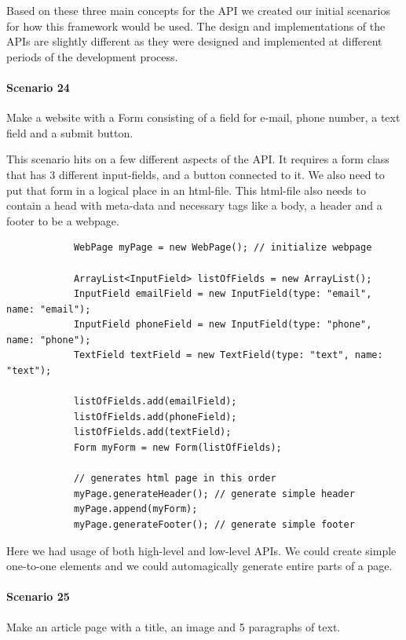 \documentclass[12pt]{article}
\begin{document}
    Based on these three main concepts for the API we created our initial scenarios for how this framework would be used. 
    The design and implementations of the APIs are slightly different as they were designed and implemented at different periods of the development process.

    \paragraph{Scenario 24}
    Make a website with a Form consisting of a field for e-mail, phone number, a text field and a submit button.

    This scenario hits on a few different aspects of the API. It requires a form class that has 3 different input-fields, and a button connected to it. We also need to put that form in a logical place in an html-file. This html-file also needs to contain a head with meta-data and necessary tags like a body, a header and a footer to be a webpage.

    \begin{shaded}
        \begin{lstlisting}
            WebPage myPage = new WebPage(); // initialize webpage

            ArrayList<InputField> listOfFields = new ArrayList();
            InputField emailField = new InputField(type: "email", name: "email");
            InputField phoneField = new InputField(type: "phone", name: "phone");
            TextField textField = new TextField(type: "text", name: "text");

            listOfFields.add(emailField);
            listOfFields.add(phoneField);
            listOfFields.add(textField);
            Form myForm = new Form(listOfFields);

            // generates html page in this order
            myPage.generateHeader(); // generate simple header
            myPage.append(myForm);
            myPage.generateFooter(); // generate simple footer
        \end{lstlisting}
    \end{shaded}

    Here we had usage of both high-level and low-level APIs. We could create simple one-to-one elements and we could automagically generate entire parts of a page. 

    \paragraph{Scenario 25}
    Make an article page with a title, an image and 5 paragraphs of text.
\end{document}
